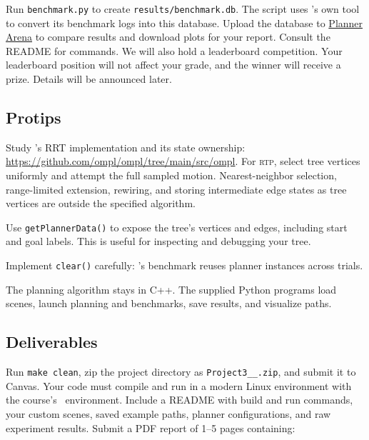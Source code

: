 \documentclass{comp450}
\begin{document}
\begin{enumerate*}
    Run \texttt{benchmark.py} to create \texttt{results/benchmark.db}.
    The script uses \ompl's own tool to convert its benchmark logs into this database.
    Upload the database to \href{https://planner-arena.kavrakilab.rice.edu/}{Planner Arena}
    to compare results and download plots for your report.
    Consult the README for commands.
    We will also hold a leaderboard competition.
    Your leaderboard position will not affect your grade, and the winner will receive a prize.
    Details will be announced later.
\end{enumerate*}

\clearpage
\subsection*{Protips}
\begin{itemize*}
    \item
    Study \ompl's RRT implementation and its state ownership:
    \url{https://github.com/ompl/ompl/tree/main/src/ompl}.
    For \textsc{rtp}, select tree vertices uniformly and attempt the full sampled motion.
    Nearest-neighbor selection, range-limited extension, rewiring, and storing intermediate edge states as tree vertices are outside the specified algorithm.
    \item
    Use \texttt{getPlannerData()} to expose the tree's vertices and edges, including start and goal labels.
    This is useful for inspecting and debugging your tree.
    \item
    Implement \texttt{clear()} carefully: \ompl's benchmark reuses planner instances across trials.
    \item
    The planning algorithm stays in C++.
    The supplied Python programs load scenes, launch planning and benchmarks, save results, and visualize paths.
\end{itemize*}

\subsection*{Deliverables}
Run \texttt{make clean}, zip the project directory as
\texttt{Project3\_<your NetID>\_<partner NetID>.zip}, and submit it to Canvas.
Your code must compile and run in a modern Linux environment with the course's \ompl\ environment.
Include a README with build and run commands, your custom scenes, saved example paths, planner configurations, and raw experiment results.
Submit a PDF report of 1--5 pages containing:
\end{document}
